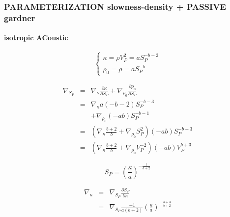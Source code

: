 \documentclass[9pt]{beamer}
\newcommand{\partderi}[2]{\frac{\partial#1}{\partial#2}}
\begin{document}
\begin{frame}
\end{frame}

\begin{frame}\frametitle{PARAMETERIZATION slowness-density + PASSIVE gardner}
\framesubtitle{isotropic ACoustic}

  \begin{center}
  \end{center}

  \begin{minipage}{0.5\linewidth}
    \[\left\{ \begin{array}{l}
      \kappa = \rho V_P^2 = a S_P^{-b-2} \\
      \rho_0 = \rho = a S_P ^{-b}
    \end{array} \right.\]
    
    \begin{eqnarray}
      \nabla_{S_P} &=& \nabla_{\kappa} \partderi{\kappa}{S_P} + \nabla_{\rho_0} \partderi{\rho_0}{S_P} \nonumber\\
                   &=& \nabla_{\kappa} a(-b-2) S_P^{-b-3} \nonumber\\
                   & &+\nabla_{\rho_0} (-ab) S_P^{-b-1} \nonumber\\
                   &=& \left( \nabla_{\kappa} \frac{b+2}{b} + \nabla_{\rho_0} S_P^2 \right) (-ab)S_P^{-b-3} \nonumber\\
                   &=& \left( \nabla_{\kappa} \frac{b+2}{b} + \nabla_{\rho_0} V_P^{-2} \right) (-ab)V_P^{b+3} \nonumber
    \end{eqnarray}

  \end{minipage} \vline
  \begin{minipage}{0.45\linewidth}
    \[ S_P = \left(\frac{\kappa}{a}\right)^{-\frac{1}{b+2}} \]
    
    \begin{eqnarray}
      \nabla_{\kappa} &=& \nabla_{S_P} \partderi{S_P}{\kappa} \nonumber\\
                      &=& \nabla_{S_P} \frac{-1}{a(b+2)} \left(\frac{\kappa}{a}\right)^{-\frac{b+3}{b+2}} \nonumber
    \end{eqnarray}
  \end{minipage}

\end{frame}
\end{document}
